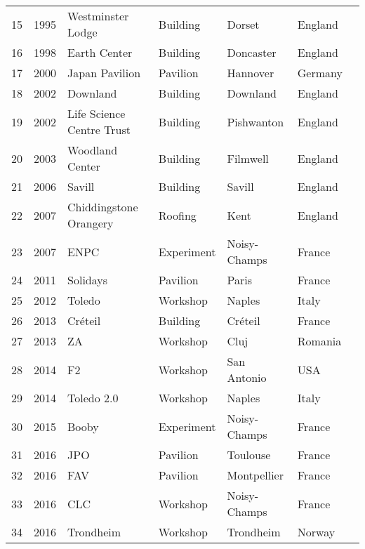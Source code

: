 {{{\begin{tabularx}{\textwidth}{@{}llXlllr@{}}
					15 & 1995 & Westminster Lodge & Building & Dorset & England & \cite{Burton1998}\\
					16 & 1998 & Earth Center & Building & Doncaster & England & \\
					17 & 2000 & Japan Pavilion & Pavilion & Hannover & Germany & \cite{Ban2006}\\
					18 & 2002 & Downland & Building & Downland & England & \cite{Harris2003}\\
					19 & 2002 & Life Science Centre Trust & Building & Pishwanton & England & \\
					20 & 2003 & Woodland Center & Building & Filmwell & England & \\
					21 & 2006 & Savill & Building & Savill & England & \cite{Harris2008}\\
					22 & 2007 & Chiddingstone Orangery & Roofing & Kent & England & \\
					23 & 2007 & ENPC & Experiment & Noisy-Champs & France & \cite{Douthe2006}\\
					24 & 2011 & Solidays & Pavilion & Paris & France & \cite{Baverel2012}\\
					25 & 2012 & Toledo & Workshop & Naples & Italy & \cite{DAmico2014}\\
					26 & 2013 & Créteil & Building & Créteil & France & \cite{DuPeloux2016}\\
					27 & 2013 & ZA & Workshop & Cluj & Romania & \\
					28 & 2014 & F2 & Workshop & San Antonio & USA & \\
					29 & 2014 & Toledo 2.0 & Workshop & Naples & Italy & \cite{DAmico2015a}\\
					30 & 2015 & Booby & Experiment & Noisy-Champs & France & \cite{Cuvilliers2017}\\
					31 & 2016 & JPO & Pavilion & Toulouse & France & \\
					32 & 2016 & FAV & Pavilion & Montpellier & France & \\
					33 & 2016 & CLC & Workshop & Noisy-Champs & France & \\
					34 & 2016 & Trondheim & Workshop & Trondheim & Norway & \cite{Mork2016}\\
					\bottomrule
						 \end{tabularx}}
	}
}

